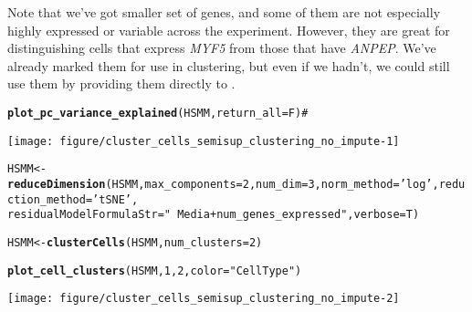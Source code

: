 \documentclass[10pt,oneside]{article}\usepackage[]{graphicx}\usepackage[]{color}
\makeatletter
\def\maxwidth{ %
  \ifdim\Gin@nat@width>\linewidth
    \linewidth
  \else
    \Gin@nat@width
  \fi
}
\newcommand{\hlnum}[1]{\textcolor[rgb]{0.686,0.059,0.569}{#1}}%
\newcommand{\hlstr}[1]{\textcolor[rgb]{0.192,0.494,0.8}{#1}}%
\newcommand{\hlcom}[1]{\textcolor[rgb]{0.678,0.584,0.686}{\textit{#1}}}%
\newcommand{\hlstd}[1]{\textcolor[rgb]{0.345,0.345,0.345}{#1}}%
\newcommand{\hlkwb}[1]{\textcolor[rgb]{0.69,0.353,0.396}{#1}}%
\newcommand{\hlkwc}[1]{\textcolor[rgb]{0.333,0.667,0.333}{#1}}%
\newcommand{\hlkwd}[1]{\textcolor[rgb]{0.737,0.353,0.396}{\textbf{#1}}}%
\newenvironment{kframe}{%
 \def\at@end@of@kframe{}%
 \ifinner\ifhmode%
  \def\at@end@of@kframe{\end{minipage}}%
  \begin{minipage}{\columnwidth}%
 \fi\fi%
 \def\FrameCommand##1{\hskip\@totalleftmargin \hskip-\fboxsep
 \colorbox{shadecolor}{##1}\hskip-\fboxsep
     \hskip-\linewidth \hskip-\@totalleftmargin \hskip\columnwidth}%
 \MakeFramed {\advance\hsize-\width
   \@totalleftmargin\z@ \linewidth\hsize
   \@setminipage}}%
 {\par\unskip\endMakeFramed%
 \at@end@of@kframe}
\newenvironment{knitrout}{}{} %
\makeatother
\begin{document}
Note that we've got smaller set of genes, and some of them are not especially highly expressed or variable across the experiment. However, they are great for distinguishing cells that express \emph{MYF5} from those that have \emph{ANPEP}. We've already marked them for use in clustering, but even if we hadn't, we could still use them by providing them directly to .

\begin{knitrout}
\color{fgcolor}\begin{kframe}
\begin{alltt}
\hlkwd{plot_pc_variance_explained}\hlstd{(HSMM,} \hlkwc{return_all} \hlstd{= F)} \hlcom{# }
\end{alltt}
\end{kframe}

{\centering \texttt{[image: figure/cluster\_cells\_semisup\_clustering\_no\_impute-1]} 

}


\begin{kframe}\begin{alltt}
\hlstd{HSMM} \hlkwb{<-} \hlkwd{reduceDimension}\hlstd{(HSMM,} \hlkwc{max_components}\hlstd{=}\hlnum{2}\hlstd{,} \hlkwc{num_dim} \hlstd{=} \hlnum{3}\hlstd{,} \hlkwc{norm_method} \hlstd{=} \hlstr{'log'}\hlstd{,} \hlkwc{reduction_method} \hlstd{=} \hlstr{'tSNE'}\hlstd{,}
                       \hlkwc{residualModelFormulaStr}\hlstd{=}\hlstr{"~Media + num_genes_expressed"}\hlstd{,} \hlkwc{verbose} \hlstd{= T)}
\end{alltt}


{\ttfamily\noindent\itshape\color{messagecolor}{\#\# Removing batch effects}}

{\ttfamily\noindent\itshape\color{messagecolor}{\#\# Remove noise by PCA ...}}

{\ttfamily\noindent\itshape\color{messagecolor}{\#\# Reduce dimension by tSNE ...}}\begin{alltt}
\hlstd{HSMM} \hlkwb{<-} \hlkwd{clusterCells}\hlstd{(HSMM,} \hlkwc{num_clusters}\hlstd{=}\hlnum{2}\hlstd{)}

\hlkwd{plot_cell_clusters}\hlstd{(HSMM,} \hlnum{1}\hlstd{,} \hlnum{2}\hlstd{,} \hlkwc{color}\hlstd{=}\hlstr{"CellType"}\hlstd{)}
\end{alltt}
\end{kframe}

{\centering \texttt{[image: figure/cluster\_cells\_semisup\_clustering\_no\_impute-2]} 

}



\end{knitrout}
 
\end{document}
